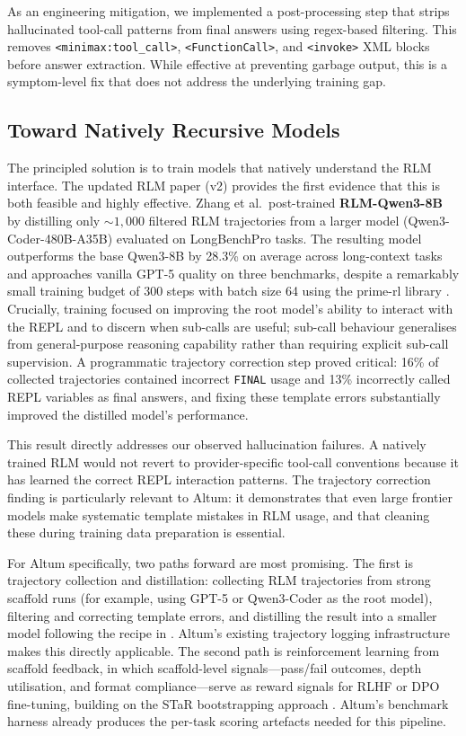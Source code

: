 \documentclass[11pt]{article}
\begin{document}
As an engineering mitigation, we implemented a post-processing step that strips hallucinated tool-call patterns from final answers using regex-based filtering. This removes \texttt{<minimax:tool\_call>}, \texttt{<FunctionCall>}, and \texttt{<invoke>} XML blocks before answer extraction. While effective at preventing garbage output, this is a symptom-level fix that does not address the underlying training gap.

\subsection{Toward Natively Recursive Models}

The principled solution is to train models that natively understand the RLM interface. The updated RLM paper (v2) \cite{zhang2025rlm} provides the first evidence that this is both feasible and highly effective. Zhang et al.\ post-trained \textbf{RLM-Qwen3-8B} by distilling only ${\sim}1{,}000$ filtered RLM trajectories from a larger model (Qwen3-Coder-480B-A35B) evaluated on LongBenchPro \cite{chen2026longbenchpro} tasks. The resulting model outperforms the base Qwen3-8B by 28.3\% on average across long-context tasks and approaches vanilla GPT-5 quality on three benchmarks, despite a remarkably small training budget of 300 steps with batch size 64 using the prime-rl library \cite{primerl2025}. Crucially, training focused on improving the root model's ability to interact with the REPL and to discern when sub-calls are useful; sub-call behaviour generalises from general-purpose reasoning capability rather than requiring explicit sub-call supervision. A programmatic trajectory correction step proved critical: 16\% of collected trajectories contained incorrect \texttt{FINAL} usage and 13\% incorrectly called REPL variables as final answers, and fixing these template errors substantially improved the distilled model's performance.

This result directly addresses our observed hallucination failures. A natively trained RLM would not revert to provider-specific tool-call conventions because it has learned the correct REPL interaction patterns. The trajectory correction finding is particularly relevant to Altum: it demonstrates that even large frontier models make systematic template mistakes in RLM usage, and that cleaning these during training data preparation is essential.

For Altum specifically, two paths forward are most promising. The first is trajectory collection and distillation: collecting RLM trajectories from strong scaffold runs (for example, using GPT-5 or Qwen3-Coder as the root model), filtering and correcting template errors, and distilling the result into a smaller model following the recipe in \cite{zhang2025rlm}. Altum's existing trajectory logging infrastructure makes this directly applicable. The second path is reinforcement learning from scaffold feedback, in which scaffold-level signals---pass/fail outcomes, depth utilisation, and format compliance---serve as reward signals for RLHF or DPO fine-tuning, building on the STaR bootstrapping approach \cite{zelikman2022star,zelikman2024quiet}. Altum's benchmark harness already produces the per-task scoring artefacts needed for this pipeline.
\end{document}
